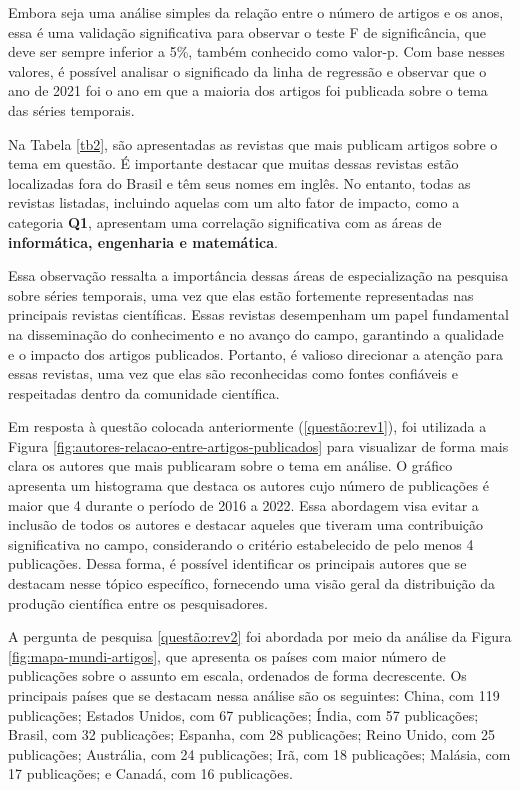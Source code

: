 Embora seja uma análise simples da relação entre o número de artigos e os anos, essa é uma validação significativa para observar o teste F de significância, que deve ser sempre inferior a 5\%, também conhecido como valor-p. Com base nesses valores, é possível analisar o significado da linha de regressão e observar que o ano de 2021 foi o ano em que a maioria dos artigos foi publicada sobre o tema das séries temporais.



Na Tabela \ref{tb2}, são apresentadas as revistas que mais publicam artigos sobre o tema em questão. É importante destacar que muitas dessas revistas estão localizadas fora do Brasil e têm seus nomes em inglês. No entanto, todas as revistas listadas, incluindo aquelas com um alto fator de impacto, como a categoria \textbf{Q1}, apresentam uma correlação significativa com as áreas de \textbf{informática, engenharia e matemática}.

Essa observação ressalta a importância dessas áreas de especialização na pesquisa sobre séries temporais, uma vez que elas estão fortemente representadas nas principais revistas científicas. Essas revistas desempenham um papel fundamental na disseminação do conhecimento e no avanço do campo, garantindo a qualidade e o impacto dos artigos publicados. Portanto, é valioso direcionar a atenção para essas revistas, uma vez que elas são reconhecidas como fontes confiáveis e respeitadas dentro da comunidade científica.





Em resposta à questão colocada anteriormente (\ref{questão:rev1}), foi utilizada a Figura \ref{fig:autores-relacao-entre-artigos-publicados} para visualizar de forma mais clara os autores que mais publicaram sobre o tema em análise. O gráfico apresenta um histograma que destaca os autores cujo número de publicações é maior que 4 durante o período de 2016 a 2022. Essa abordagem visa evitar a inclusão de todos os autores e destacar aqueles que tiveram uma contribuição significativa no campo, considerando o critério estabelecido de pelo menos 4 publicações. Dessa forma, é possível identificar os principais autores que se destacam nesse tópico específico, fornecendo uma visão geral da distribuição da produção científica entre os pesquisadores.




A pergunta de pesquisa \ref{questão:rev2} foi abordada por meio da análise da Figura \ref{fig:mapa-mundi-artigos}, que apresenta os países com maior número de publicações sobre o assunto em escala, ordenados de forma decrescente. Os principais países que se destacam nessa análise são os seguintes: China, com 119 publicações; Estados Unidos, com 67 publicações; Índia, com 57 publicações; Brasil, com 32 publicações; Espanha, com 28 publicações; Reino Unido, com 25 publicações; Austrália, com 24 publicações; Irã, com 18 publicações; Malásia, com 17 publicações; e Canadá, com 16 publicações.

